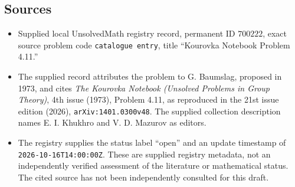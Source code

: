 \documentclass[11pt]{article}
\begin{document}
\subsection{Sources}
\begin{itemize}
\item Supplied local UnsolvedMath registry record, permanent ID \(700222\), exact source problem code \texttt{catalogue entry}, title ``Kourovka Notebook Problem 4.11.''
\item The supplied record attributes the problem to G. Baumslag, proposed in 1973, and cites \emph{The Kourovka Notebook (Unsolved Problems in Group Theory)}, 4th issue (1973), Problem 4.11, as reproduced in the 21st issue edition (2026), \texttt{arXiv:1401.0300v48}. The supplied collection description names E. I. Khukhro and V. D. Mazurov as editors.
\item The registry supplies the status label ``open'' and an update timestamp of \texttt{2026-10-16T14:00:00Z}. These are supplied registry metadata, not an independently verified assessment of the literature or mathematical status. The cited source has not been independently consulted for this draft.
\end{itemize}
\end{document}
